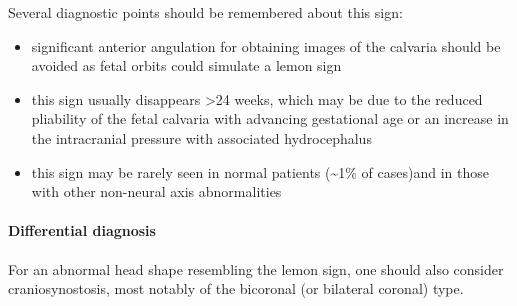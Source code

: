 Several diagnostic points should be remembered about this sign:

\begin{itemize}
	\tightlist
	\item
	significant anterior angulation for obtaining images of the calvaria should be avoided as fetal orbits could simulate a lemon sign
	\item
	this sign usually disappears \textgreater24 weeks, which may be due to the reduced pliability of the fetal calvaria with advancing gestational age or an increase in the intracranial pressure with associated hydrocephalus
	\item
	this sign may be rarely seen in normal patients (\textasciitilde1\% of cases)and in those with other non-neural axis abnormalities
\end{itemize}

\paragraph{Differential diagnosis}

For an abnormal head shape resembling the lemon sign, one should also consider craniosynostosis, most notably of the bicoronal (or bilateral coronal) type.